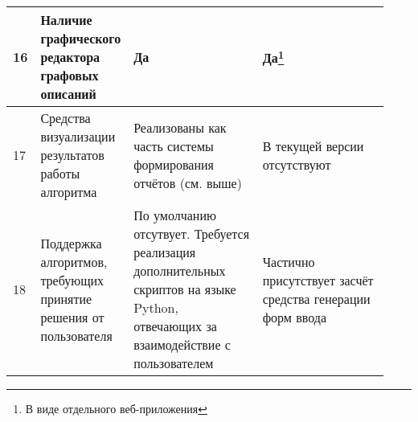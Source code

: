 \begin{landscape}
\begin{longtable}{|p{0.03\linewidth}|p{0.2\linewidth}|p{0.35\linewidth}|p{0.35\linewidth}|}
        16         & Наличие графического редактора графовых описаний                                           & Да                                                                                                                                                                                                                                                                                                                                                                                                                                                                                                                                                                                                                                                                & Да\footnote{В виде отдельного веб-приложения}                                                                                                                                                                                                                                     \\
        \hline
        17         & Средства визуализации результатов работы алгоритма                                         & Реализованы как часть системы формирования отчётов (см. выше)                                                                                                                                                                                                                                                                                                                                                                                                                                                                                                                                                                                                     & В текущей версии отсутствуют                                                                                                                                                                                                                                                      \\
        \hline
        18         & Поддержка алгоритмов, требующих принятие решения от пользователя                           & По умолчанию отсутвует. Требуется реализация дополнительных скриптов на языке Python, отвечающих за взаимодействие с пользователем                                                                                                                                                                                                                                                                                                                                                                                                                                                                                                                                & Частично присутствует засчёт средства генерации форм ввода\cite{SokolovPershin2017}                                                                                                                                                                                               \\

\end{longtable}
\end{landscape}
